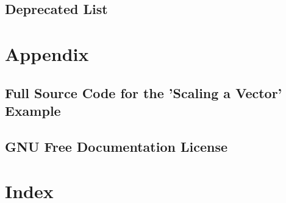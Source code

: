 













































\chapter{Deprecated List}
\label{deprecated}
\hypertarget{deprecated}{}


\part{Appendix}

\chapter{Full Source Code for the ’Scaling a Vector’ Example}
\label{FullSourceCodeVectorScal}
\hypertarget{FullSourceCodeVectorScal}{}


\chapter{GNU Free Documentation License}
\label{GNUFreeDocumentationLicense}
\hypertarget{GNUFreeDocumentationLicense}{}


\part{Index}
\printindex



